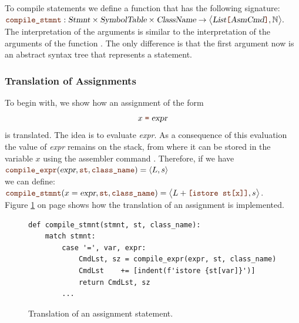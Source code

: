 To compile statements we define a function
 that has the following signature:
\\[0.2cm]
\hspace*{1.3cm}
$\mytt{compile\_stmnt}: \textsl{Stmnt} \times \textsl{SymbolTable} \times \textsl{ClassName} \rightarrow 
                 \bigl\langle\textsl{List}\mytt{[}\textsl{AsmCmd}\mytt{]}, \mathbb{N}\bigr\rangle.$
\\[0.2cm]
The interpretation of the arguments is similar to the interpretation of the arguments
of the function .  The only difference is that the first argument now is an abstract syntax
tree that represents a statement.

\subsubsection{Translation of Assignments}
To begin with, we show how an assignment of the form 
\[ x \;\mytt{=}\; \textsl{expr} \]
is translated.  The idea is to evaluate \textsl{expr}.  As a consequence of this evaluation  the value of
\textsl{expr} remains on the stack, from where it can be stored in the variable $x$ using the assembler command 
. Therefore, if we have
\\[0.2cm]
\hspace*{1.3cm}
$\mytt{compile\_expr}(\textsl{expr}, \mytt{st}, \mytt{class\_name}) = \pair(L, s)$
\\[0.2cm]
we can define:
\\[0.2cm]
\hspace*{1.3cm}
$\mytt{compile\_stmnt}(x = \textsl{expr}, \mytt{st}, \mytt{class\_name})
= \bigl\langle L + \mytt{[istore st[x]]}, s \bigr\rangle $.
\\[0.2cm]
Figure \ref{fig:Compiler.ipynb:compile:assign} on page \pageref{fig:Compiler.ipynb:compile:assign} shows how the
translation of an assignment is implemented.


\begin{figure}[!ht]
\centering
\begin{verbatim}
def compile_stmnt(stmnt, st, class_name):
    match stmnt:
        case '=', var, expr:
            CmdLst, sz = compile_expr(expr, st, class_name)
            CmdLst    += [indent(f'istore {st[var]}')]
            return CmdLst, sz
        ...
\end{verbatim}
\vspace*{-0.3cm}
\caption{Translation of an assignment statement.}
\label{fig:Compiler.ipynb:compile:assign}
\end{figure}





